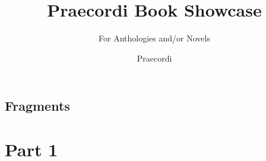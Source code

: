 \documentclass[
]{praecordi-book}
\title{Praecordi Book Showcase}
\subtitle{For Anthologies and/or Novels}
\author{Praecordi}
\begin{document}
\maketitle
\tableofcontents

\frontmatter

\begin{draft}
  
  

  \setcounter{part}{-1}
  \part{Fragments}

\end{draft}

\mainmatter

\part{Part 1}
\setcounter{chapter}{0}

\end{document}
